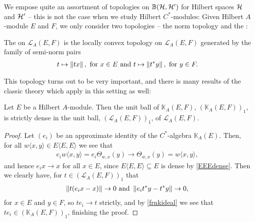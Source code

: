 We empose quite an assortment of topologies on $\mathbb{B}(\mathcal{H},\mathcal{H}')$ for Hilbert spaces $\mathcal{H}$ and $\mathcal{H}'$ -- this is not the case when we study Hilbert $C^*$-modules: Given Hilbert $A$-module $E$ and $F$, we only consider two topologies -- the norm topology and the :
\begin{definition}
	The  on $\mathcal{L}_A(E,F)$ is the locally convex topology on $\mathcal{L}_A(E,F)$ generated by the family of semi-norm pairs
	\begin{align*}
		t \mapsto \left\lVert tx\right\rVert, \text{ for } x \in E \text{ and }		t \mapsto \left\lVert t^*y \right\rVert, \text{ for } y \in F.
	\end{align*}
\end{definition}
This topology turns out to be very important, and there is many results of the classic theory which apply in this setting as well:
\begin{proposition}
	Let $E$ be a Hilbert $A$-module. Then the unit ball of $\mathbb{K}_A(E,F)$, $(\mathbb{K}_A(E,F))_1$, is strictly dense in the unit ball, $(\mathcal{L}_A(E,F))_1$, of $\mathcal{L}_A(E,F)$.
	\label{mult:unitstrictdense}
\end{proposition}
\begin{proof}
	Let $(e_i)$ be an approximate identity of the $C^*$-algebra $\mathbb{K}_A(E)$. Then, for all $w\langle x,y \rangle \in E\langle E,E \rangle$ we see that
	\begin{align*}
		e_i w\langle x,y \rangle = e_i \Theta_{w,x}(y) \to \Theta_{w,x}(y) = w \langle x,y\rangle,
	\end{align*}
	and hence $e_i x \to x$ for all $x \in E$, since $E\langle E,E\rangle \subseteq E$ is dense by \ref{EEEdense}. Then we clearly have, for $t \in (\mathcal{L}_A(E,F))_1$ that
	\begin{align*}
		\left\lVert t(e_ix-x)\right\rVert \to 0 \text{  and  } \left\lVert e_it^*y-t^*y\right\rVert \to 0,
	\end{align*}
	for $x \in E$ and $y \in F$, so $te_i \to t$ strictly, and by \ref{frnkideal} we see that $te_i \in (\mathbb{K}_A(E,F))_1$, finishing the proof.
\end{proof}


